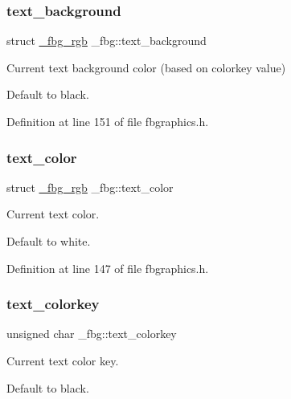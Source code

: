 \mbox{\label{struct__fbg_afd34a8de5a853e915bd101f11d44cf67}} 
\subsubsection{\texorpdfstring{text\+\_\+background}{text\_background}}
{\footnotesize\ttfamily struct \hyperlink{fbgraphics_8h_struct__fbg__rgb}{\+\_\+fbg\+\_\+rgb} \+\_\+fbg\+::text\+\_\+background}



Current text background color (based on colorkey value) 

Default to black. 

Definition at line 151 of file fbgraphics.\+h.

\mbox{\label{struct__fbg_a4abb858439598b09790ec6d5d8326bb2}} 
\subsubsection{\texorpdfstring{text\+\_\+color}{text\_color}}
{\footnotesize\ttfamily struct \hyperlink{fbgraphics_8h_struct__fbg__rgb}{\+\_\+fbg\+\_\+rgb} \+\_\+fbg\+::text\+\_\+color}



Current text color. 

Default to white. 

Definition at line 147 of file fbgraphics.\+h.

\mbox{\label{struct__fbg_a06e65293cf0b48e70d76d63f5de453e6}} 
\subsubsection{\texorpdfstring{text\+\_\+colorkey}{text\_colorkey}}
{\footnotesize\ttfamily unsigned char \+\_\+fbg\+::text\+\_\+colorkey}



Current text color key. 

Default to black. 

